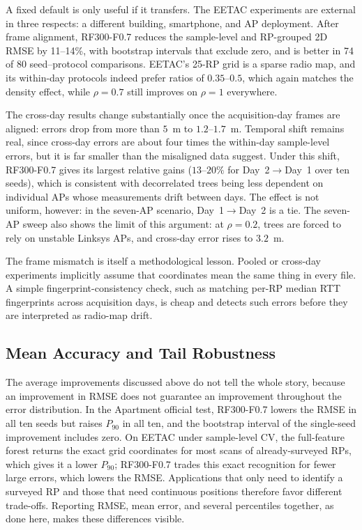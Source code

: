 A fixed default is only useful if it transfers. The EETAC experiments are external in three respects: a different building, smartphone, and AP deployment. After frame alignment, RF300-F0.7 reduces the sample-level and RP-grouped 2D RMSE by 11--14\%, with bootstrap intervals that exclude zero, and is better in 74 of 80 seed--protocol comparisons. EETAC's 25-RP grid is a sparse radio map, and its within-day protocols indeed prefer ratios of $0.35$--$0.5$, which again matches the density effect, while $\rho=0.7$ still improves on $\rho=1$ everywhere.

The cross-day results change substantially once the acquisition-day frames are aligned: errors drop from more than $5$~m to $1.2$--$1.7$~m. Temporal shift remains real, since cross-day errors are about four times the within-day sample-level errors, but it is far smaller than the misaligned data suggest. Under this shift, RF300-F0.7 gives its largest relative gains ($13$--$20\%$ for Day~2$\rightarrow$Day~1 over ten seeds), which is consistent with decorrelated trees being less dependent on individual APs whose measurements drift between days. The effect is not uniform, however: in the seven-AP scenario, Day~1$\rightarrow$Day~2 is a tie. The seven-AP sweep also shows the limit of this argument: at $\rho=0.2$, trees are forced to rely on unstable Linksys APs, and cross-day error rises to $3.2$~m.

The frame mismatch is itself a methodological lesson. Pooled or cross-day experiments implicitly assume that coordinates mean the same thing in every file. A simple fingerprint-consistency check, such as matching per-RP median RTT fingerprints across acquisition days, is cheap and detects such errors before they are interpreted as radio-map drift.

\subsection{Mean Accuracy and Tail Robustness}
\label{subsec:discussion_tail}

The average improvements discussed above do not tell the whole story, because an improvement in RMSE does not guarantee an improvement throughout the error distribution. In the Apartment official test, RF300-F0.7 lowers the RMSE in all ten seeds but raises $P_{90}$ in all ten, and the bootstrap interval of the single-seed improvement includes zero. On EETAC under sample-level CV, the full-feature forest returns the exact grid coordinates for most scans of already-surveyed RPs, which gives it a lower $P_{90}$; RF300-F0.7 trades this exact recognition for fewer large errors, which lowers the RMSE. Applications that only need to identify a surveyed RP and those that need continuous positions therefore favor different trade-offs. Reporting RMSE, mean error, and several percentiles together, as done here, makes these differences visible.

